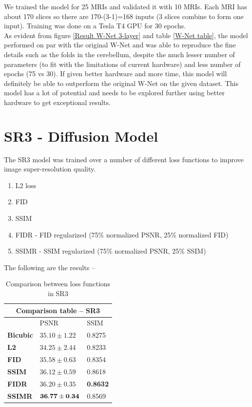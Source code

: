 We trained the model for 25 MRIs and validated it with 10 MRIs. Each MRI has about 170 slices so there are 170-(3-1)=168 inputs (3 slices combine to form one input). Training was done on a Tesla T4 GPU for 30 epochs.\\

As evident from figure \ref{Result W-Net 3-layer} and table \ref{W-Net table}, the model performed on par with the original W-Net and was able to reproduce the fine details such as the folds in the cerebellum, despite the much lesser number of parameters (to fit with the limitations of current hardware) and less number of epochs (75 vs 30). If given better hardware and more time, this model will definitely be able to outperform the original W-Net on the given dataset. This model has a lot of potential and needs to be explored further using better hardware to get exceptional results.


\section{SR3 - Diffusion Model} \label{Observation - SR3}

The SR3 model was trained over a number of different loss functions to improve image super-resolution quality.
\begin{enumerate}
    \item L2 loss
    \item FID
    \item SSIM
    \item FIDR - FID regularized (75\% normalized PSNR, 25\% normalized FID)
    \item SSIMR - SSIM regularized (75\% normalized PSNR, 25\% SSIM)
\end{enumerate}

The following are the results --\\


\begin{table}[h]
\begin{center}
\begin{tabular}{ p{4cm} m{3cm} m{3cm} }
 \hline
 \multicolumn{3}{c}{Comparison table -- SR3} \\
 \hline
 & PSNR & SSIM \\
 \hline
 \hline
 \textbf{Bicubic} & $35.10 \pm 1.22$ & 0.8275\\
 \textbf{L2}    & $34.25 \pm 2.44$ & 0.8233 \\
 \hline
 \textbf{FID}& $35.58 \pm 0.63$  & 0.8354 \\
 \textbf{SSIM}& $36.12 \pm 0.59 $& 0.8618 \\
  \textbf{FIDR}& $36.20 \pm 0.35$  & \textbf{0.8632} \\
 \textbf{SSIMR}& $\bf{36.77 \pm 0.34 }$& 0.8569 \\
 \hline
\end{tabular}
\end{center}
\caption{Comparison between loss functions in SR3}
\label{SR3 table}
\end{table}

